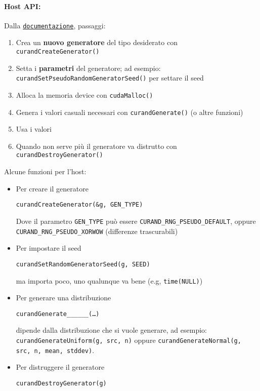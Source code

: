 \paragraph{Host API:} Dalla \href{https://docs.nvidia.com/cuda/curand/index.html}{\texttt{documentazione}}, passaggi:
\begin{enumerate}
	\item Crea un \textbf{nuovo generatore} del tipo desiderato con \texttt{curandCreateGenerator()}
	
	\item Setta i \textbf{parametri} del generatore; ad esempio: \texttt{curandSetPseudoRandomGeneratorSeed()} per settare il seed
	
	\item Alloca la memoria device con \texttt{cudaMalloc()}
	
	\item Genera i valori casuali necessari con \texttt{curandGenerate()} (o altre funzioni)
	
	\item Usa i valori
	
	\item Quando non serve più il generatore va distrutto con \texttt{curandDestroyGenerator()}
\end{enumerate}

Alcune funzioni per l'host: 
\begin{itemize}
	\item Per creare il generatore
	\begin{verbatim}
curandCreateGenerator(&g, GEN_TYPE)
	\end{verbatim}
	Dove il parametro \texttt{GEN\_TYPE} può essere \texttt{CURAND\_RNG\_PSEUDO\_DEFAULT}, oppure \texttt{CURAND\_RNG\_PSEUDO\_XORWOW} (differenze trascurabili)
	
	\item Per impostare il seed
	\begin{verbatim}
curandSetRandomGeneratorSeed(g, SEED)
	\end{verbatim}
	ma importa poco, uno qualunque va bene (e.g, \texttt{time(NULL)})
	
	\item Per generare una distribuzione
	\begin{verbatim}
curandGenerate______(…)
	\end{verbatim}
	dipende dalla distribuzione che si vuole generare, ad esempio: \texttt{curandGenerateUniform(g, src, n)} oppure \texttt{curandGenerateNormal(g, src, n, mean, stddev)}. 

	\item Per distruggere il generatore
	\begin{verbatim}
curandDestroyGenerator(g)
	\end{verbatim}
\end{itemize}

